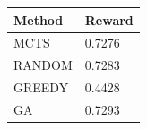 \begin{tabular}{ll}
\hline
Method & Reward \\
\hline
  MCTS & 0.7276 \\
  RANDOM & 0.7283 \\
  GREEDY & 0.4428 \\
  GA & 0.7293 \\
\hline
\end{tabular}
